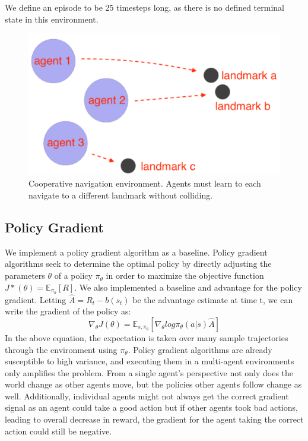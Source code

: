 \documentclass{article}
\begin{document}
We define an episode to be 25 timesteps long, as there is no defined terminal state in this environment.

\begin{figure}
\begin{center}
\includegraphics[scale=0.5]{env-image}
\end{center}
\caption{Cooperative navigation environment. Agents must learn to each navigate to a different landmark without colliding.}
\end{figure}

\subsection{Policy Gradient}
We implement a policy gradient algorithm as a baseline. Policy gradient algorithms seek to determine the optimal policy by directly adjusting the parameters $\theta$ of a policy $\pi_\theta$ in order to maximize the objective function $J*(\theta) = \mathbb{E}_{\pi_\theta}[R]$. We also implemented a baseline and advantage for the policy gradient. Letting $\hat{A} = R_t - b(s_t)$ be the advantage estimate at time t, we can write the gradient of the policy as:
$$\nabla_\theta J(\theta) = \mathbb{E}_{s,\pi_\theta}[\nabla_\theta log \pi_\theta(a|s)\hat{A}]$$
In the above equation, the expectation is taken over many sample trajectories through the environment using $\pi_\theta$. Policy gradient algorithms are already susceptible to  high variance, and executing them in a multi-agent environments only amplifies the problem. From a single agent's perspective not only does the world change as other agents move, but the policies other agents follow change as well. Additionally, individual agents might not always get the correct gradient signal as an agent could take a good action but if other agents took bad actions, leading to overall decrease in reward, the gradient for the agent taking the correct action could still be negative.
\end{document}
